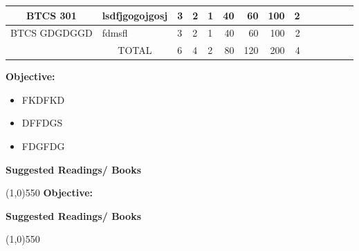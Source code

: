 \documentclass{article}
\begin{document}
{\begin{tabularx}{\linewidth}{|*{15}{X|}}
\hline
\cline{3-7}
           \multicolumn{1}{|c|}{BTCS 301} & \multicolumn{2}{l|}{lsdfjgogojgosj} &  3 & 2 & 1 & \multicolumn{1}{|r|}{40} & \multicolumn{1}{|r|}{60} & \multicolumn{1}{|r|}{100} & \multicolumn{1}{|r|}{2} \\
\hline
           \multicolumn{1}{|c|}{BTCS GDGDGGD} & \multicolumn{2}{l|}{fdmsfl} &  3 & 2 & 1 & \multicolumn{1}{|r|}{40} & \multicolumn{1}{|r|}{60} & \multicolumn{1}{|r|}{100} & \multicolumn{1}{|r|}{2} \\
\hline
\cline{3-7}
&\multicolumn{2}{c|}{TOTAL} & 6 & 4 & 2 & \multicolumn{1}{|r|}{80} & \multicolumn{1}{|r|}{120} & \multicolumn{1}{|r|}{200} & \multicolumn{1}{|r|}{4}\\
\hline
	
\end{tabularx}
\clearpage
\center{\bf\color{black}{Punjab Technical University}}\linebreak
\bf\color{black}{}}
\linebreak\linebreak\linebreak
\large{\bf{Objective:}}
	
\begin{itemize}
\item {\small{FKDFKD } }
\end{itemize}


\begin{itemize}
\item {\small{DFFDGS } }
\end{itemize}


\begin{itemize}
\item {\small{FDGFDG } }
\end{itemize}


\begin{flushleft}
{\color{black}\bf{Suggested Readings/ Books}}
\end{flushleft}
\color{black}\line(1,0){550}
\clearpage
\clearpage
{} 
\linebreak\linebreak\linebreak
\large{\bf{Objective:}}
	
\begin{flushleft}
{\color{black}\bf{Suggested Readings/ Books}}
\end{flushleft}
\color{black}\line(1,0){550}
\clearpage
\clearpage
\end{document}
